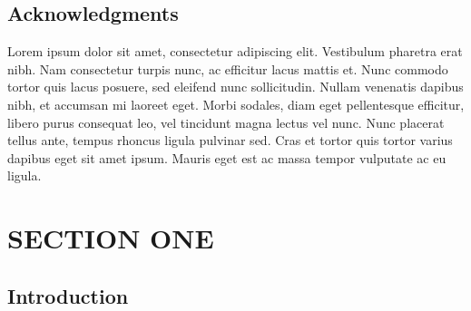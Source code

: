 \documentclass[a4paper]{memoir}
\begin{document}
\chapter*{Acknowledgments}
\label{acknowledgments}

Lorem ipsum dolor sit amet, consectetur adipiscing elit. Vestibulum pharetra erat nibh. Nam consectetur turpis nunc, ac efficitur lacus mattis et. Nunc commodo tortor quis lacus posuere, sed eleifend nunc sollicitudin. Nullam venenatis dapibus nibh, et accumsan mi laoreet eget. Morbi sodales, diam eget pellentesque efficitur, libero purus consequat leo, vel tincidunt magna lectus vel nunc. Nunc placerat tellus ante, tempus rhoncus ligula pulvinar sed. Cras et tortor quis tortor varius dapibus eget sit amet ipsum. Mauris eget est ac massa tempor vulputate ac eu ligula. 


\pagebreak 

\tableofcontents
\label{contents}

\pagebreak

\mainmatter


\part{SECTION ONE}
\label{sectionone}

\chapter*{Introduction}
\label{introduction}
\end{document}
